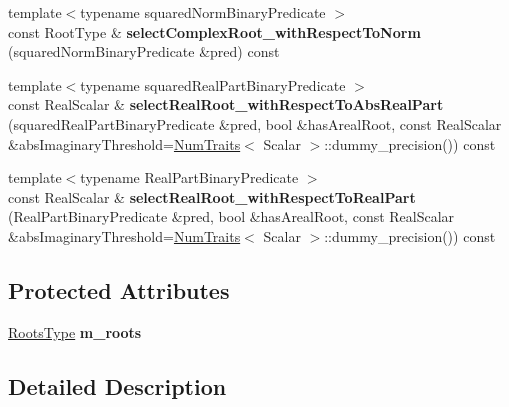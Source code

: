 \begin{DoxyCompactItemize}
\item 
\mbox{\label{class_eigen_1_1_polynomial_solver_base_a0f84c55daac618ccef0f19e01ba0863f}} 
{\footnotesize template$<$typename squared\+Norm\+Binary\+Predicate $>$ }\\const Root\+Type \& {\bfseries select\+Complex\+Root\+\_\+with\+Respect\+To\+Norm} (squared\+Norm\+Binary\+Predicate \&pred) const
\item 
\mbox{\label{class_eigen_1_1_polynomial_solver_base_afd4ddab1be4bdb2b1055194b86de1885}} 
{\footnotesize template$<$typename squared\+Real\+Part\+Binary\+Predicate $>$ }\\const Real\+Scalar \& {\bfseries select\+Real\+Root\+\_\+with\+Respect\+To\+Abs\+Real\+Part} (squared\+Real\+Part\+Binary\+Predicate \&pred, bool \&has\+Areal\+Root, const Real\+Scalar \&abs\+Imaginary\+Threshold=\hyperlink{group___core___module_struct_eigen_1_1_num_traits}{Num\+Traits}$<$ Scalar $>$\+::dummy\+\_\+precision()) const
\item 
\mbox{\label{class_eigen_1_1_polynomial_solver_base_ae5275e8911cb0f27d8a9b6648221c320}} 
{\footnotesize template$<$typename Real\+Part\+Binary\+Predicate $>$ }\\const Real\+Scalar \& {\bfseries select\+Real\+Root\+\_\+with\+Respect\+To\+Real\+Part} (Real\+Part\+Binary\+Predicate \&pred, bool \&has\+Areal\+Root, const Real\+Scalar \&abs\+Imaginary\+Threshold=\hyperlink{group___core___module_struct_eigen_1_1_num_traits}{Num\+Traits}$<$ Scalar $>$\+::dummy\+\_\+precision()) const
\end{DoxyCompactItemize}
\subsection*{Protected Attributes}
\begin{DoxyCompactItemize}
\item 
\mbox{\label{class_eigen_1_1_polynomial_solver_base_ac0426c8e64f4152d2365d3b114d4c7d3}} 
\hyperlink{group___core___module}{Roots\+Type} {\bfseries m\+\_\+roots}
\end{DoxyCompactItemize}


\subsection{Detailed Description}
